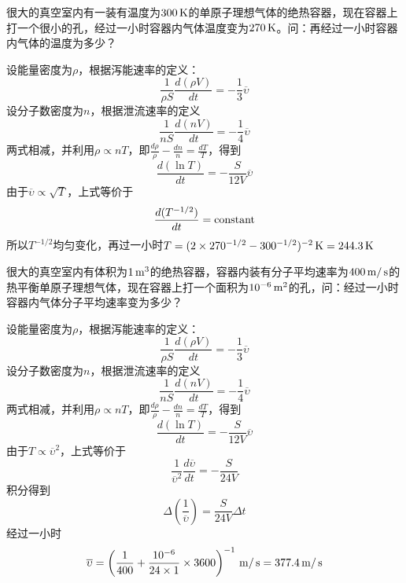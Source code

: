 \documentclass[CJK]{beamer}
\begin{document}
\begin{frame}
\bch
{}

很大的真空室内有一装有温度为$300\,\mathrm{K}$的单原子理想气体的绝热容器，现在容器上打一个很小的孔，经过一小时容器内气体温度变为$270\,\mathrm{K}$。问：再经过一小时容器内气体的温度为多少？
\ech
\end{frame}

\begin{frame}
\bch
{\scriptsize
设能量密度为$\rho$，根据泻能速率的定义：
$$\frac{1}{\rho S} \frac{d(\rho V)}{dt} = -\frac{1}{3}\overline{\upsilon}  $$
设分子数密度为$n$，根据泄流速率的定义
$$\frac{1}{n S} \frac{d(n V)}{dt} = -\frac{1}{4}\overline{\upsilon}  $$
两式相减，并利用$\rho \propto n T$，即$\frac{d\rho}{\rho} - \frac{dn}{n} = \frac{dT}{T}$，得到
$$ \frac{d(\ln T)}{dt} = -\frac{S}{12V}\overline{\upsilon}  $$
由于$\overline{\upsilon} \propto \sqrt{T}$，上式等价于
$$ \frac{d (T^{-1/2})}{dt} = \mathrm{constant} $$
所以$T^{-1/2}$均匀变化，再过一小时$T = (2\times 270^{-1/2}-300^{-1/2})^{-2}\,\mathrm{K} = 244.3 \,\mathrm{K}$
}
\ech
\end{frame}

\begin{frame}
\bch
{}

很大的真空室内有体积为$1\,\mathrm{m}^3$的绝热容器，容器内装有分子平均速率为$400\,\mathrm{m}/\,\mathrm{s}$的热平衡单原子理想气体，现在容器上打一个面积为$10^{-6}\,\mathrm{m}^2$的孔，问：经过一小时容器内气体分子平均速率变为多少？

\ech
\end{frame}

\begin{frame}
\bch
{\scriptsize
设能量密度为$\rho$，根据泻能速率的定义：
$$\frac{1}{\rho S} \frac{d(\rho V)}{dt} = -\frac{1}{3}\overline{\upsilon}  $$
设分子数密度为$n$，根据泄流速率的定义
$$\frac{1}{n S} \frac{d(n V)}{dt} = -\frac{1}{4}\overline{\upsilon}  $$
两式相减，并利用$\rho \propto n T$，即$\frac{d\rho}{\rho} - \frac{dn}{n} = \frac{dT}{T}$，得到
$$ \frac{d(\ln T)}{dt} = -\frac{S}{12V}\overline{\upsilon}  $$
由于$T\propto \overline{\upsilon}^2 $，上式等价于
$$ \frac{1}{\overline{\upsilon}^2}\frac{d\overline{\upsilon}}{dt} = -\frac{S}{24V}$$
积分得到
$$ \Delta\left(\frac{1}{\overline{\upsilon}}\right)= \frac{S}{24V}\Delta t$$
经过一小时
$$ \overline{\upsilon} = \left(\frac{1}{400} + \frac{10^{-6}}{24\times 1}\times 3600\right)^{-1}\,\mathrm{m}/\,\mathrm{s} = 377.4\,\mathrm{m}/\,\mathrm{s}$$
}
\ech
\end{frame}
\end{document}
